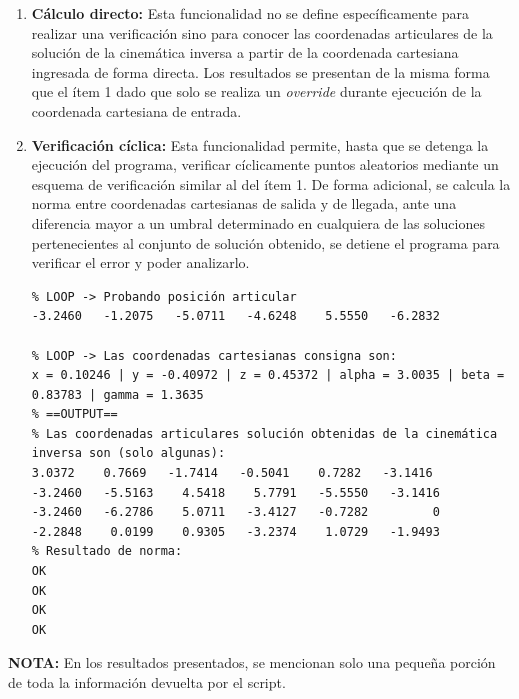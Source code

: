 \documentclass{article}
\begin{document}
\begin{appendices}
\begin{enumerate}
\begin{lstlisting}[style=Matlab-editor, basicstyle=\small\ttfamily]
% --- Resumen estadístico IK (poses aleatorias) ---
Poses testeadas:    300
Sin solución IK:    0
\end{lstlisting}
\begin{lstlisting}[basicstyle=\small\ttfamily]
  Poses verificadas:  300  (100.0%)
  Error posición    - max: 3.66e-06 m    prom: 2.06e-06 m
  Error orientación - max: 1.10e-05 rad  prom: 6.20e-06 rad
\end{lstlisting}

    \item \textbf{Cálculo directo: } Esta funcionalidad no se define específicamente para realizar una verificación sino para  conocer las coordenadas articulares de la solución de la cinemática inversa a partir de la coordenada cartesiana ingresada de forma directa. Los resultados se presentan de la misma forma que el ítem 1 dado que solo se realiza un \textit{override} durante ejecución de la coordenada cartesiana de entrada.
    \item \textbf{Verificación cíclica: } Esta funcionalidad permite, hasta que se detenga la ejecución del programa, verificar cíclicamente puntos aleatorios mediante un esquema de verificación similar al del ítem 1. De forma adicional, se calcula la norma entre coordenadas cartesianas de salida y de llegada, ante una diferencia mayor a un umbral determinado en cualquiera de las soluciones pertenecientes al conjunto de solución obtenido, se detiene el programa para verificar el error y poder analizarlo.
\begin{lstlisting}[style=Matlab-editor, basicstyle=\small\ttfamily]
% ==INPUT ==
% LOOP -> Probando posición articular
-3.2460   -1.2075   -5.0711   -4.6248    5.5550   -6.2832

% LOOP -> Las coordenadas cartesianas consigna son: 
x = 0.10246 | y = -0.40972 | z = 0.45372 | alpha = 3.0035 | beta = 0.83783 | gamma = 1.3635
% ==OUTPUT==
% Las coordenadas articulares solución obtenidas de la cinemática inversa son (solo algunas):
3.0372    0.7669   -1.7414   -0.5041    0.7282   -3.1416
-3.2460   -5.5163    4.5418    5.7791   -5.5550   -3.1416
-3.2460   -6.2786    5.0711   -3.4127   -0.7282         0
-2.2848    0.0199    0.9305   -3.2374    1.0729   -1.9493
% Resultado de norma:
OK
OK
OK
OK

\end{lstlisting}
\end{enumerate}

\textbf{NOTA:} En los resultados presentados, se mencionan solo una pequeña porción de toda la información devuelta por el script.


\end{appendices}
\end{document}
